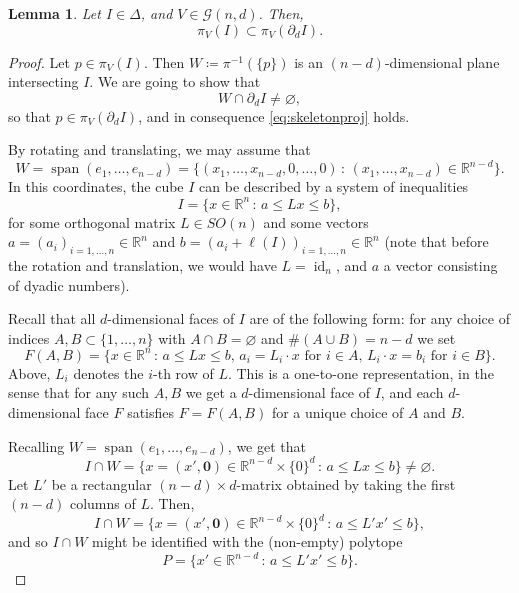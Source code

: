 \documentclass[11pt,reqno]{amsart}
\def\dG{{\mathcal{G}}}
\renewcommand{\d}{{\partial}}
\def\spn{\mathop\mathrm{span}}
\def\id{\mathop\mathrm{id}}						%
\newtheorem{lemma}[theorem]{Lemma}
\theoremstyle{definition}
\theoremstyle{remark}
\numberwithin{equation}{section}
\newcommand{\R}{\mathbb{R}}
\theoremstyle{theorem}
\theoremstyle{definition}
\theoremstyle{remark}
\numberwithin{equation}{section}
\begin{document}
	\begin{lemma}\label{lem:skeletonsprojection}
		Let $I\in\Delta$, and $V\in\dG(n,d)$. Then,
		\begin{equation}\label{eq:skeletonproj}
			\pi_V({I}) \subset \pi_V(\d_d I).
		\end{equation}
	\end{lemma}
	\begin{proof}
		Let $p \in \pi_V(I)$. Then $W\coloneqq \pi^{-1}(\{p\})$ is an $(n-d)$-dimensional plane intersecting $I$. We are going to show that
		\begin{equation}\label{eq:planeskeleton}
		W\cap\partial_d I\neq\varnothing,
		\end{equation}
		so that $p\in \pi_V(\d_d I)$, and in consequence \eqref{eq:skeletonproj} holds.
		
		By rotating and translating, we may assume that
		\begin{equation*}
		W=\spn(e_1,\dots,e_{n-d})=\{(x_1,\dots,x_{n-d},0,\dots,0)\,:\, (x_1,\dots,x_{n-d})\in\R^{n-d} \}.
		\end{equation*}
		In this coordinates, the cube $I$ can be described by a system of inequalities
		\begin{equation*}
		I = \{x\in\R^n\,:\, a\le Lx\le b\},
		\end{equation*}
		for some orthogonal matrix $L\in SO(n)$ and some vectors $a=(a_i)_{i=1,\dots,n}\in\R^n$ and $b=(a_i+\ell(I))_{i=1,\dots,n}\in\R^n$ (note that before the rotation and translation, we would have $L=\id_n$, and $a$ a vector consisting of dyadic numbers). 
		
		Recall that all $d$-dimensional faces of $I$ are of the following form: for any choice of indices $A,B\subset\{1,\dots,n\}$ with $A\cap B=\varnothing$ and $\#(A\cup B)=n-d$ we set
		\begin{equation*}
		F(A,B) = \{x\in\R^n\,:\, a\le Lx\le b,\, a_i=L_i\cdot x \text{ for $i\in A$, } L_i\cdot x = b_i \text{ for $i\in B$}\}.
		\end{equation*}
		Above, $L_i$ denotes the $i$-th row of $L$. This is a one-to-one representation, in the sense that for any such $A,B$ we get a $d$-dimensional face of $I$, and each $d$-dimensional face $F$ satisfies $F=F(A,B)$ for a unique choice of $A$ and $B$.
		
		Recalling $W=\spn(e_1,\dots,e_{n-d})$, we get that
		\begin{equation*}
		I\cap W = \{x=(x',\textbf{0})\in\R^{n-d}\times\{0\}^d\,:\, a\le Lx\le b\}\neq\varnothing.
		\end{equation*}
		Let $L'$ be a rectangular $(n-d)\times d$-matrix obtained by taking the first $(n-d)$ columns of $L$. Then,
		\begin{equation*}
		I\cap W = \{x=(x',\textbf{0})\in\R^{n-d}\times\{0\}^d\,:\, a\le L'x'\le b\},
		\end{equation*}
		and so $I\cap W$ might be identified with the (non-empty) polytope 
		\begin{equation*}
		P = \{x'\in\R^{n-d}\,:\, a\le L'x'\le b\}.
		\end{equation*}
		

\end{proof}
\end{document}

